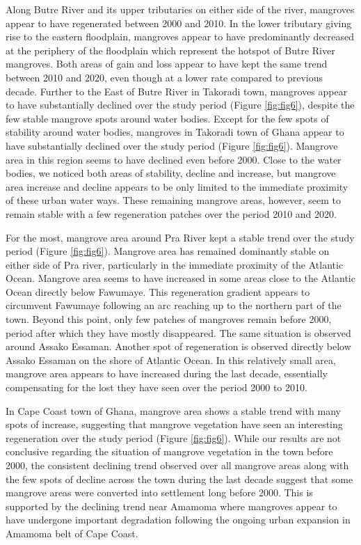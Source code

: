 \documentclass[12pt,oneside,preprint,3p,authoryear,times]{elsarticle} %
\begin{document}
Along Butre River and its upper tributaries on either side of the river,
mangroves appear to have regenerated between 2000 and 2010. In the lower
tributary giving rise to the eastern floodplain, mangroves appear to
have predominantly decreased at the periphery of the floodplain which
represent the hotspot of Butre River mangroves. Both areas of gain and
loss appear to have kept the same trend between 2010 and 2020, even
though at a lower rate compared to previous decade. Further to the East
of Butre River in Takoradi town, mangroves appear to have substantially
declined over the study period (Figure \ref{fig:fig6}), despite the few
stable mangrove spots around water bodies. Except for the few spots of
stability around water bodies, mangroves in Takoradi town of Ghana
appear to have substantially declined over the study period (Figure
\ref{fig:fig6}). Mangrove area in this region seems to have declined
even before 2000. Close to the water bodies, we noticed both areas of
stability, decline and increase, but mangrove area increase and decline
appears to be only limited to the immediate proximity of these urban
water ways. These remaining mangrove areas, however, seem to remain
stable with a few regeneration patches over the period 2010 and 2020.

For the most, mangrove area around Pra River kept a stable trend over
the study period (Figure \ref{fig:fig6}). Mangrove area has remained
dominantly stable on either side of Pra river, particularly in the
immediate proximity of the Atlantic Ocean. Mangrove area seems to have
increased in some areas close to the Atlantic Ocean directly below
Fawumaye. This regeneration gradient appears to circumvent Fawumaye
following an arc reaching up to the northern part of the town. Beyond
this point, only few patches of mangroves remain before 2000, period
after which they have mostly disappeared. The same situation is observed
around Assako Essaman. Another spot of regeneration is observed directly
below Assako Essaman on the shore of Atlantic Ocean. In this relatively
small area, mangrove area appears to have increased during the last
decade, essentially compensating for the lost they have seen over the
period 2000 to 2010.

In Cape Coast town of Ghana, mangrove area shows a stable trend with
many spots of increase, suggesting that mangrove vegetation have seen an
interesting regeneration over the study period (Figure \ref{fig:fig6}).
While our results are not conclusive regarding the situation of mangrove
vegetation in the town before 2000, the consistent declining trend
observed over all mangrove areas along with the few spots of decline
across the town during the last decade suggest that some mangrove areas
were converted into settlement long before 2000. This is supported by
the declining trend near Amamoma where mangroves appear to have
undergone important degradation following the ongoing urban expansion in
Amamoma belt of Cape Coast.
\end{document}
